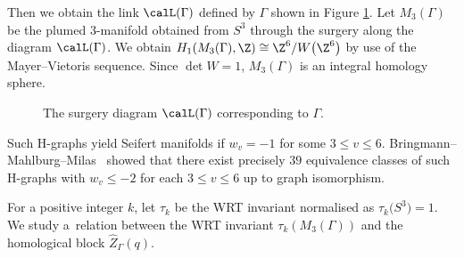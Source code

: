 Then we obtain the link $ \calL(\Gamma) $ defined by $ \Gamma $ shown in Figure \ref{fig:surgery_diagram}.
Let $M_3(\Gamma)$ be the plumed 3-ma\-nifold obtained from $ S^3 $ through the surgery along the diagram $ \calL(\Gamma) $.
We obtain $H_1(M_{3}(\Gamma), \Z)\allowbreak \cong \Z^{6} / W\big(\Z^{6}\big)$ by use of the Mayer--Vietoris sequence.
Since $\det W = 1$, $M_{3}(\Gamma)$ is an integral homology sphere.
\begin{figure}[h]	\centering
{}
\caption{The surgery diagram $ \calL(\Gamma) $ corresponding to $\Gamma$.}\label{fig:surgery_diagram}
\end{figure}

{\samepage
Such H-graphs yield Seifert manifolds if $ w_v = -1 $ for some $ 3 \le v \le 6 $.
Bringmann--Mahlburg--Milas~\cite[Theorem~1.2]{BMM} showed that there exist precisely $ 39 $ equivalence classes of such H-graphs with $ w_v \le -2 $ for each $ 3 \le v \le 6 $ up to graph isomorphism.

}

For a positive integer $k$, let $\tau_k$ be the WRT invariant normalised as $\tau_{k}\big(S^{3}\big) = 1$.
We study a~relation between the WRT invariant $\tau_{k}(M_{3}(\Gamma))$ and the homological block $\widehat{Z}_\Gamma (q)$.

